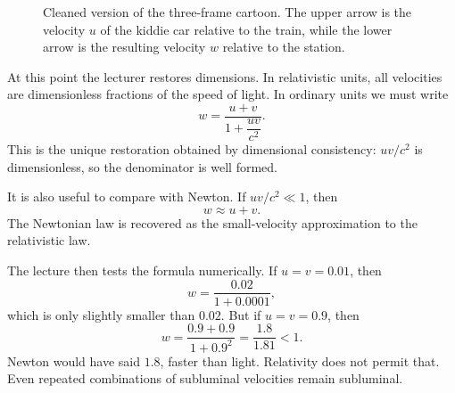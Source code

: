 \begin{figure}[t]
\centering
{}
\caption{Cleaned version of the three-frame cartoon. The upper arrow is the velocity \(u\) of the kiddie car relative to the train, while the lower arrow is the resulting velocity \(w\) relative to the station.}
\end{figure}

At this point the lecturer restores dimensions. In relativistic units, all velocities are dimensionless fractions of the speed of light. In ordinary units we must write
\begin{equation}
w=\frac{u+v}{1+\dfrac{uv}{c^2}}.
\end{equation}
This is the unique restoration obtained by dimensional consistency: \(uv/c^2\) is dimensionless, so the denominator is well formed.

It is also useful to compare with Newton. If \(uv/c^2\ll 1\), then
\begin{equation}
w \approx u+v.
\end{equation}
The Newtonian law is recovered as the small-velocity approximation to the relativistic law.

The lecture then tests the formula numerically. If \(u=v=0.01\), then
\begin{equation}
w=\frac{0.02}{1+0.0001},
\end{equation}
which is only slightly smaller than \(0.02\). But if \(u=v=0.9\), then
\begin{equation}
w=\frac{0.9+0.9}{1+0.9^2}=\frac{1.8}{1.81}<1.
\end{equation}
Newton would have said \(1.8\), faster than light. Relativity does not permit that. Even repeated combinations of subluminal velocities remain subluminal.

